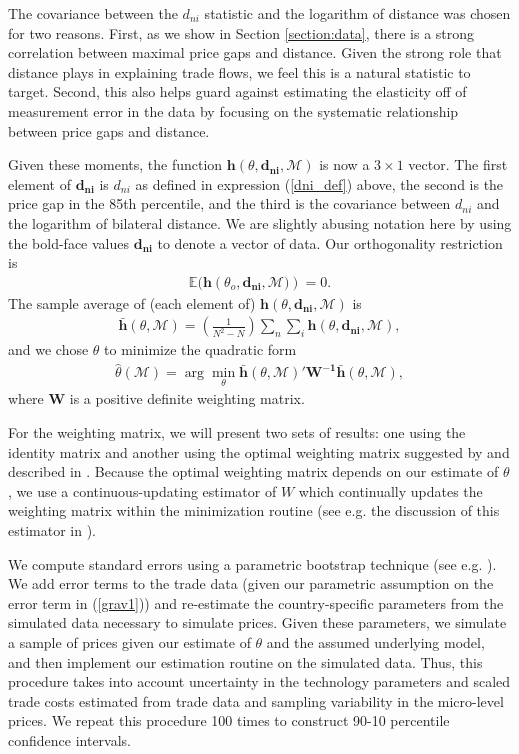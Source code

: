 \documentclass[12pt,dvips, ps2pdf]{article}
\begin{document}
The covariance between the $d_{ni}$ statistic and the logarithm of distance was chosen for two reasons. First, as we show in Section \ref{section:data}, there is a strong correlation between maximal price gaps and distance. Given the strong role that distance plays in explaining trade flows, we feel this is a natural statistic to target. Second, this also helps guard against estimating the elasticity off of measurement error in the data by focusing on the systematic relationship between price gaps and distance.

Given these moments, the function $\mathbf{h}(\theta, \mathbf{d_{ni}}, \mathcal{M})$ is now a $3\times1$ vector. The first element of $\mathbf{d_{ni}}$ is $d_{ni}$ as defined in expression (\ref{dni_def}) above, the second is the price gap in the 85th percentile, and the third is the covariance between $d_{ni}$ and the logarithm of bilateral distance. We are slightly abusing notation here by using the bold-face values $\mathbf{d_{ni}}$ to denote a vector of data. Our orthogonality restriction is
\begin{align}
\mathbb{E}(\mathbf{h}\left(\theta_o, \mathbf{d_{ni}},\mathcal{M})\right) = 0.
\end{align}
The sample average of (each element of) $\mathbf{h}(\theta, \mathbf{d_{ni}}, \mathcal{M})$ is
\begin{align}
\mathbf{\bar{h}}(\theta,\mathcal{M}) = \left(\frac{1}{N^2-N}\right)\sum_{n}\sum_{i}\mathbf{h}(\theta,\mathbf{d_{ni}},\mathcal{M}),
\end{align}
and we chose $\theta$ to minimize the quadratic form
\begin{align}
\hat \theta(\mathcal{M}) = \arg\min_\theta \mathbf{\bar{h}}(\theta,\mathcal{M})'\mathbf{W^{-1}}\mathbf{\bar{h}}(\theta,\mathcal{M}),
\label{eq:quad_form_over}
\end{align}
where $\mathbf{W}$ is a positive definite weighting matrix.

For the weighting matrix, we will present two sets of results: one using the identity matrix and another using the optimal weighting matrix suggested by \citet{french_guys96} and described in \citet{adda2003dynamic}. Because the optimal weighting matrix depends on our estimate of $\theta$, we use a continuous-updating estimator of $W$ which continually updates the weighting matrix within the minimization routine (see e.g. the discussion of this estimator in \citet{hansen1996finite}).

We compute standard errors using a parametric bootstrap technique (see e.g. \citet{davison1997bootstrap}). We add error terms to the trade data (given our parametric assumption on the error term in (\ref{grav1})) and re-estimate the country-specific parameters from the simulated data necessary to simulate prices. Given these parameters, we simulate a sample of prices given our estimate of $\theta$ and the assumed underlying model, and then implement our estimation routine on the simulated data. Thus, this procedure takes into account uncertainty in the technology parameters and scaled trade costs estimated from trade data and sampling variability in the micro-level prices. We repeat this procedure 100 times to construct 90-10 percentile confidence intervals.
\end{document}
